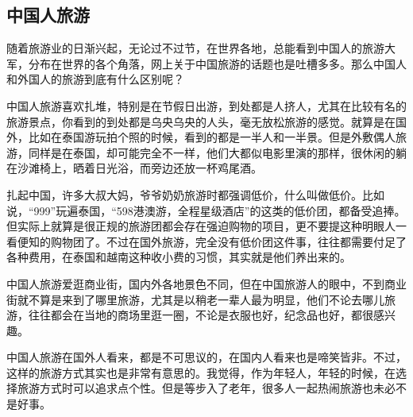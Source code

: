 \subsection{中国人旅游}

随着旅游业的日渐兴起，无论过不过节，在世界各地，总能看到中国人的旅游大军，分布在世界的各个角落，网上关于中国旅游的话题也是吐槽多多。那么中国人和外国人的旅游到底有什么区别呢？

中国人旅游喜欢扎堆，特别是在节假日出游，到处都是人挤人，尤其在比较有名的旅游景点，你看到的到处都是乌央乌央的人头，毫无放松旅游的感觉。就算是在国外，比如在泰国游玩拍个照的时候，看到的都是一半人和一半景。但是外敷偶人旅游，同样是在泰国，却可能完全不一样，他们大都似电影里演的那样，很休闲的躺在沙滩椅上，晒着日光浴，而旁边还放一杯鸡尾酒。

扎起中国，许多大叔大妈，爷爷奶奶旅游时都强调低价，什么叫做低价。比如说，“999”玩遍泰国，“598港澳游，全程星级酒店”的这类的低价团，都备受追捧。但实际上就算是很正规的旅游团都会存在强迫购物的项目，更不要提这种明眼人一看便知的购物团了。不过在国外旅游，完全没有低价团这件事，往往都需要付足了各种费用，在泰国和越南这种收小费的习惯，其实就是他们养出来的。

中国人旅游爱逛商业街，国内外各地景色不同，但在中国旅游人的眼中，不到商业街就不算是来到了哪里旅游，尤其是以稍老一辈人最为明显，他们不论去哪儿旅游，往往都会在当地的商场里逛一圈，不论是衣服也好，纪念品也好，都很感兴趣。

中国人旅游在国外人看来，都是不可思议的，在国内人看来也是啼笑皆非。不过，这样的旅游方式其实也是非常有意思的。我觉得，作为年轻人，年轻的时候，在选择旅游方式时可以追求点个性。但是等步入了老年，很多人一起热闹旅游也未必不是好事。

